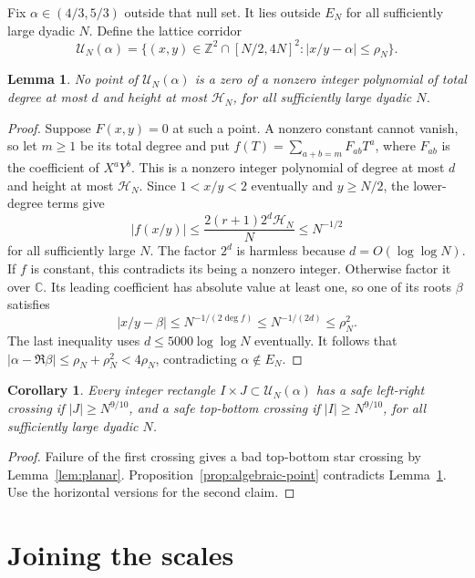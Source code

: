 \documentclass[11pt]{article}
\newtheorem{lemma}[theorem]{Lemma}
\newtheorem{corollary}[theorem]{Corollary}
\theoremstyle{definition}
\theoremstyle{remark}
\newcommand{\ZZ}{\mathbb Z}
\newcommand{\CC}{\mathbb C}
\begin{document}
Fix $\alpha\in(4/3,5/3)$ outside that null set. It lies outside $E_N$
for all sufficiently large dyadic $N$. Define the lattice corridor
\begin{equation}\label{eq:corridor}
 \mathcal U_N(\alpha)=
 \{(x,y)\in\ZZ^2\cap[N/2,4N]^2:|x/y-\alpha|\leq\rho_N\}.
\end{equation}

\begin{lemma}\label{lem:avoidance}
No point of $\mathcal U_N(\alpha)$ is a zero of a nonzero integer
polynomial of total degree at most $d$ and height at most
$\mathcal H_N$, for all sufficiently large dyadic $N$.
\end{lemma}
\begin{proof}
Suppose $F(x,y)=0$ at such a point. A nonzero constant cannot vanish, so
let $m\geq1$ be its total degree and put
$f(T)=\sum_{a+b=m}F_{ab}T^a$, where $F_{ab}$ is the coefficient of
$X^aY^b$. This is a nonzero integer polynomial of degree at most $d$
and height at most $\mathcal H_N$.
Since $1<x/y<2$ eventually and $y\geq N/2$, the lower-degree terms give
\[
 |f(x/y)|\leq\frac{2(r+1)2^d\mathcal H_N}{N}
                                                \leq N^{-1/2}
\]
for all sufficiently large $N$. The factor $2^d$ is harmless because
$d=O(\log\log N)$.
If $f$ is constant, this contradicts its being a nonzero integer.
Otherwise factor it over $\CC$. Its leading coefficient has absolute value
at least one, so one of its roots $\beta$ satisfies
\[
 |x/y-\beta|\leq N^{-1/(2\deg f)}
                   \leq N^{-1/(2d)}\leq\rho_N^2.
\]
The last inequality uses $d\leq5000\log\log N$ eventually.
It follows that $|\alpha-\Re\beta|\leq\rho_N+\rho_N^2<4\rho_N$,
contradicting $\alpha\notin E_N$.
\end{proof}

\begin{corollary}\label{cor:crossings}
Every integer rectangle $I\times J\subset\mathcal U_N(\alpha)$ has
a safe left-right crossing if $|J|\geq N^{9/10}$, and a safe top-bottom
crossing if $|I|\geq N^{9/10}$, for all sufficiently large dyadic $N$.
\end{corollary}
\begin{proof}
Failure of the first crossing gives a bad top-bottom star crossing by
Lemma~\ref{lem:planar}. Proposition~\ref{prop:algebraic-point} contradicts
Lemma~\ref{lem:avoidance}. Use the horizontal versions for the second claim.
\end{proof}

\section{Joining the scales}
\end{document}
